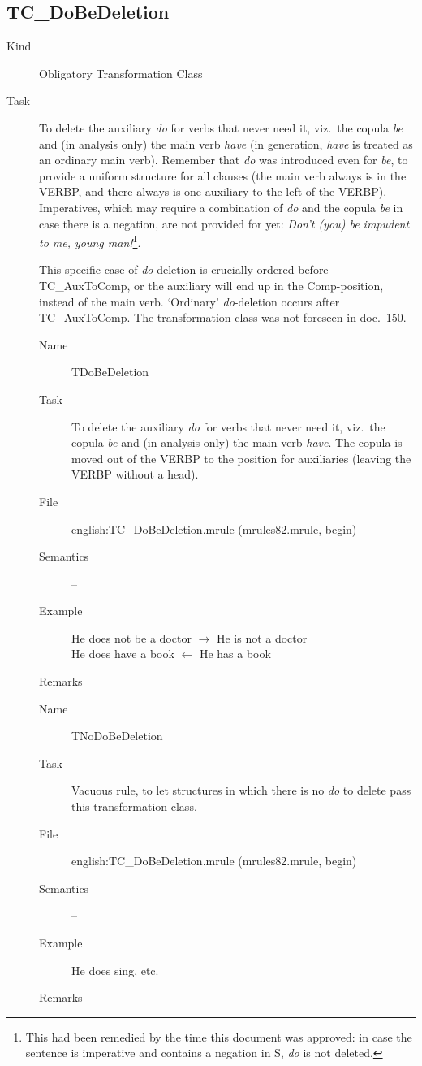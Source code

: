 \subsection{TC\_DoBeDeletion}
\begin{description}
\item[Kind] Obligatory Transformation Class
\item[Task] To delete the auxiliary {\em do\/} for verbs that never need it, 
viz.\ the copula {\em be\/} and (in analysis only) the main verb {\em have\/} 
(in generation, {\em have\/} is treated as an ordinary main verb). Remember 
that {\em do\/} was introduced even for {\em be\/}, to provide a uniform 
structure for all clauses (the main verb always is in the VERBP, and there 
always is one auxiliary to the left of the VERBP). Imperatives,
which may require a combination of {\em do\/} and 
the copula {\em be\/} in case there is a negation, are not 
provided for yet: {\em Don't (you) be impudent to me, young man!\/}\footnote{
This had been remedied by the time this document was approved: in case the 
sentence is imperative and contains a negation in S, {\em do\/} is not 
deleted.}.

This specific case of {\em do\/}-deletion is crucially ordered before 
TC\_AuxToComp, or the auxiliary will end up in the Comp-position, instead of 
the main verb. `Ordinary' {\em do\/}-deletion occurs after TC\_AuxToComp. The 
transformation class was not foreseen in doc.\ 150. 

\vspace{1 cm}
\begin{description}
\item[Name] TDoBeDeletion
\item[Task] To delete the auxiliary {\em do\/} for verbs that never need it, 
viz.\ the copula {\em be\/} and (in analysis only) the main verb {\em have\/}. 
The copula is moved out of the VERBP to the position for auxiliaries 
(leaving the VERBP without a head).
\item[File] english:TC\_DoBeDeletion.mrule (mrules82.mrule, begin)
\item[Semantics] --
\item[Example] He does not be a doctor $\rightarrow$ He is not a doctor\\
He does have a book $\leftarrow$ He has a book
\item[Remarks]
\end{description}

\vspace{1 cm}
\begin{description}
\item[Name] TNoDoBeDeletion
\item[Task] Vacuous rule, to let structures in which there is no {\em do\/} to 
delete pass this transformation class.
\item[File] english:TC\_DoBeDeletion.mrule (mrules82.mrule, begin)
\item[Semantics] --
\item[Example] He does sing, etc.
\item[Remarks]
\end{description}

\end{description}

